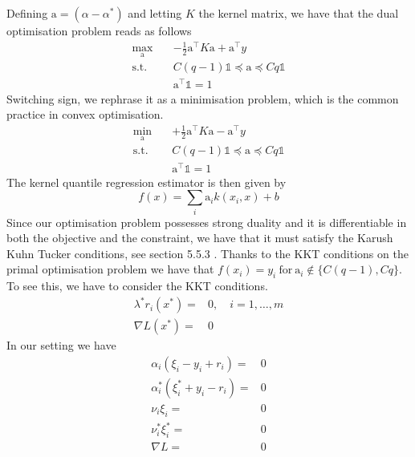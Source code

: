 Defining $\textrm{a}=(\alpha-\alpha^*)$ and letting $K$ the kernel matrix, we have that the dual optimisation problem reads as follows
\begin{equation}\label{eq:kqr_min6}
    \begin{aligned}
        \max_{\textrm{a}} \quad & -\frac{1}{2}\textrm{a}^\intercal K\textrm{a}+\textrm{a}^\intercal y\\
    \textrm{s.t.} \quad & 
    C(q-1)\mathbb{1}\preceq \textrm{a}\preceq Cq\mathbb{1}\\
    &\textrm{a}^\intercal\mathbb{1}=1
    \end{aligned}
    \end{equation}
Switching sign, we rephrase it as a minimisation problem, which is the common practice in convex optimisation.
\begin{equation}\label{eq:kqr_min7}
    \begin{aligned}
        \min_{\textrm{a}} \quad & +\frac{1}{2}\textrm{a}^\intercal K\textrm{a}-\textrm{a}^\intercal y\\
    \textrm{s.t.} \quad & 
    C(q-1)\mathbb{1}\preceq \textrm{a} \preceq Cq\mathbb{1}\\
    &\textrm{a}^\intercal\mathbb{1}=1
    \end{aligned}
    \end{equation}
The kernel quantile regression estimator is then given by
\begin{equation}
    f(x)=\sum\limits_i \textrm{a}_i k(x_i, x)+b
\end{equation}
Since our optimisation problem possesses strong duality and it is differentiable in both the objective and the constraint, we have that it must satisfy the Karush Kuhn Tucker conditions, see section 5.5.3 \cite{boyd2004convex}.
Thanks to the KKT conditions on the primal optimisation problem we have that $f(x_i)=y_i \ \mathrm{for} \ \textrm{a}_i \not \in \{C(q-1), Cq\}$. 
To see this, we have to consider the KKT conditions.
\begin{equation}
    \begin{aligned}
    \lambda^* r_i(x^*)=&0, \quad i=1,\dots,m
    \\
    \nabla L(x^*)=&0
\end{aligned}
\end{equation}
In our setting we have
\begin{equation}
    \begin{aligned}
        \alpha_i(\xi_i-y_i+r_i)=&0
        \\
        \alpha_i^*(\xi_i^*+y_i-r_i)=&0
        \\
        \nu_i \xi_i=&0
        \\
        \nu_i^* \xi_i^*=&0
        \\
        \nabla L =&0
    \end{aligned}
\end{equation}
